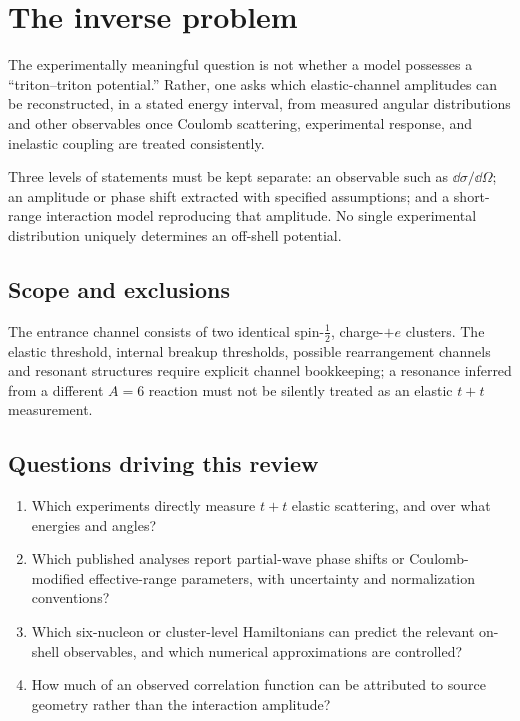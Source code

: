 \section{The inverse problem}\label{sec:tt-question}
The experimentally meaningful question is not whether a model possesses a ``triton--triton potential.'' Rather, one asks which elastic-channel amplitudes can be reconstructed, in a stated energy interval, from measured angular distributions and other observables once Coulomb scattering, experimental response, and inelastic coupling are treated consistently.

Three levels of statements must be kept separate: an observable such as $\dd\sigma/\dd\Omega$; an amplitude or phase shift extracted with specified assumptions; and a short-range interaction model reproducing that amplitude. No single experimental distribution uniquely determines an off-shell potential.

\subsection{Scope and exclusions}
The entrance channel consists of two identical spin-$\tfrac12$, charge-$+e$ clusters. The elastic threshold, internal breakup thresholds, possible rearrangement channels and resonant structures require explicit channel bookkeeping; a resonance inferred from a different $A=6$ reaction must not be silently treated as an elastic $t+t$ measurement.

\subsection{Questions driving this review}
\begin{enumerate}[label=\arabic*.]
\item Which experiments directly measure $t+t$ elastic scattering, and over what energies and angles?
\item Which published analyses report partial-wave phase shifts or Coulomb-modified effective-range parameters, with uncertainty and normalization conventions?
\item Which six-nucleon or cluster-level Hamiltonians can predict the relevant on-shell observables, and which numerical approximations are controlled?
\item How much of an observed correlation function can be attributed to source geometry rather than the interaction amplitude?
\end{enumerate}
